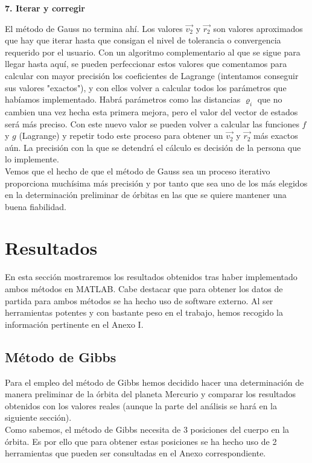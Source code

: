 \documentclass{article}
\numberwithin{equation}{section}
\begin{document}
\noindent\textbf{7. Iterar y corregir}

El método de Gauss no termina ahí. Los valores $\overrightarrow{v_2}$ y $\overrightarrow{r_2}$ son valores aproximados que hay que iterar hasta que consigan el nivel de tolerancia o convergencia requerido por el usuario. Con un algoritmo complementario al que se sigue para llegar hasta aquí, se pueden perfeccionar estos valores que comentamos para calcular con mayor precisión los coeficientes de Lagrange (intentamos conseguir sus valores "exactos"), y con ellos volver a calcular todos los parámetros que habíamos implementado. Habrá parámetros como las distancias $\varrho_i$ que no cambien una vez hecha esta primera mejora, pero el valor del vector de estados será más preciso. Con este nuevo valor se pueden volver a calcular las funciones $f$ y $g$ (Lagrange) y repetir todo este proceso para obtener un $\overrightarrow{v_2}$ y $\overrightarrow{r_2}$ más exactos aún. La precisión con la que se detendrá el cálculo es decisión de la persona que lo implemente.\\

Vemos que el hecho de que el método de Gauss sea un proceso iterativo proporciona muchísima más precisión y por tanto que sea uno de los más elegidos en la determinación preliminar de órbitas en las que se quiere mantener una buena fiabilidad.
\section{Resultados} 
En esta sección mostraremos los resultados obtenidos tras haber 
implementado ambos métodos en MATLAB. Cabe destacar que para obtener los datos de partida para ambos métodos se ha hecho uso de software externo. Al ser herramientas potentes y con bastante peso en el trabajo, hemos recogido la información pertinente en el Anexo I.\\

\subsection{Método de Gibbs}
Para el empleo del método de Gibbs hemos decidido hacer 
una determinación de manera preliminar de la órbita del 
planeta Mercurio y comparar los resultados obtenidos con los 
valores reales (aunque la parte del análisis se hará en 
la siguiente sección). \\

Como sabemos, el método de Gibbs necesita de 3 posiciones 
del cuerpo en la órbita. Es por ello que para obtener estas 
posiciones se ha hecho uso de 2 herramientas que pueden ser consultadas en el Anexo correspondiente. \\
\end{document}
